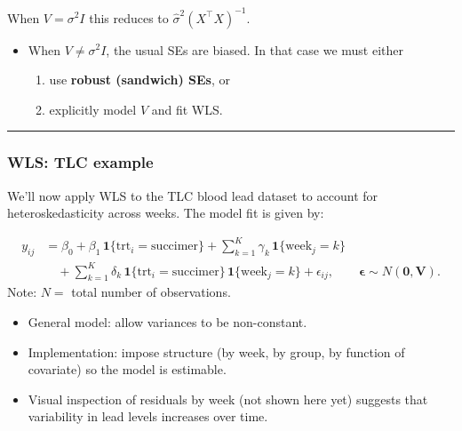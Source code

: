 \documentclass[
  letterpaper,
  DIV=11,
  numbers=noendperiod]{scrreprt}
\providecommand{\tightlist}{%
  \setlength{\itemsep}{0pt}\setlength{\parskip}{0pt}}\usepackage{longtable,booktabs,array}
\begin{document}
When \(V= \sigma^2I\) this reduces to \(\hat\sigma^2 (X^\top X)^{-1}.\)

\begin{itemize}
\tightlist
\item
  When \(V\neq\sigma^2 I\), the usual SEs are biased. In that case we
  must either

  \begin{enumerate}
  \def\labelenumi{\arabic{enumi}.}
  \tightlist
  \item
    use \textbf{robust (sandwich) SEs}, or\\
  \item
    explicitly model \(V\) and fit WLS.
  \end{enumerate}
\end{itemize}

\begin{center}\rule{0.5\linewidth}{0.5pt}\end{center}

\hypertarget{wls-tlc-example}{%
\subsubsection*{WLS: TLC example}\label{wls-tlc-example}}

We'll now apply WLS to the TLC blood lead dataset to account for
heteroskedasticity across weeks. The model fit is given by:

\[
\begin{aligned}
y_{ij} &= \beta_0 
+ \beta_1 \,\mathbf{1}\{\text{trt}_i=\text{succimer}\}
+ \sum_{k=1}^K \gamma_k \,\mathbf{1}\{\text{week}_j=k\} \\
&\quad + \sum_{k=1}^K \delta_k \,\mathbf{1}\{\text{trt}_i=\text{succimer}\}\,\mathbf{1}\{\text{week}_j=k\}
+ \epsilon_{ij},\qquad \boldsymbol{\epsilon}\sim N(\mathbf{0},\mathbf{V}).
\end{aligned}
\] Note: \(N=\) total number of observations.

\begin{itemize}
\tightlist
\item
  General model: allow variances to be non-constant.
\item
  Implementation: impose structure (by week, by group, by function of
  covariate) so the model is estimable.
\item
  Visual inspection of residuals by week (not shown here yet) suggests
  that variability in lead levels increases over time.
\end{itemize}
\end{document}
